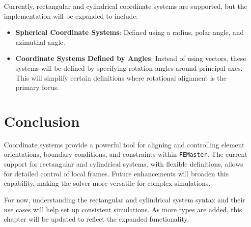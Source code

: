 Currently, rectangular and cylindrical coordinate systems are supported, but the implementation will be expanded to include:


\begin{itemize}
\item \textbf{Spherical Coordinate Systems}: Defined using a radius, polar angle, and azimuthal angle.
\item \textbf{Coordinate Systems Defined by Angles}: Instead of using vectors, these systems will be defined by specifying rotation angles around principal axes. This will simplify certain definitions where rotational alignment is the primary focus.
\end{itemize}


\section{Conclusion}


Coordinate systems provide a powerful tool for aligning and controlling element orientations, boundary conditions, and constraints within \texttt{FEMaster}. The current support for rectangular and cylindrical systems, with flexible definitions, allows for detailed control of local frames. Future enhancements will broaden this capability, making the solver more versatile for complex simulations.


For now, understanding the rectangular and cylindrical system syntax and their use cases will help set up consistent simulations. As more types are added, this chapter will be updated to reflect the expanded functionality.

